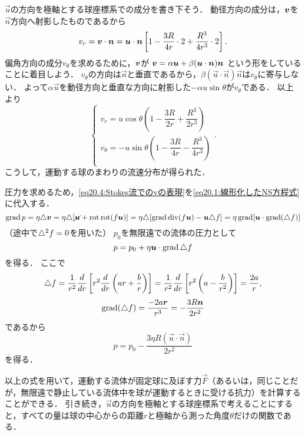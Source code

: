 $\vec{u}$の方向を極軸とする球座標系での成分を書き下そう．
動径方向の成分は，$\vb*{v}$を$\vec{n}$方向へ射影したものであるから
\[
    v_r = \vb*{v}\cdot\vb*{n}
    = \vb*{u}\cdot\vb*{n} \left[ 1 - \frac{3R}{4r} \cdot 2 + \frac{R^3}{4r^3}  \cdot 2 \right].
\]
偏角方向の成分$v_\theta$を求めるために，$\vb*{v}$が
$\vb*{v} = \alpha \vb*{u} + \beta (\vb*{u}\cdot\vb*{n})\vb*{n}$
という形をしていることに着目しよう．
$v_\theta$の方向は$\vec{n}$と垂直であるから，$\beta(\vec{u}\cdot\vec{n})\vec{n}$は$v_\theta$に寄与しない．
よって$\alpha\vec{u}$を動径方向と垂直な方向に射影した$-\alpha u \sin\theta$が$v_\theta$である．
以上より
\begin{equation}\label{eq20.10:Stokes流での流速成分}
    \begin{cases}
        v_r = u\cos\theta \left( 1-\dfrac{3R}{2r} + \dfrac{R^3}{2r^3} \right) \\[7pt]
        v_\theta = -u\sin\theta \left( 1-\dfrac{3R}{4r} - \dfrac{R^3}{4r^3} \right) \\
    \end{cases}.
\end{equation}
こうして，運動する球のまわりの流速分布が得られた．



圧力を求めるため，\eqref{eq20.4:Stokes流でのvの表現}を\eqref{eq20.1:線形化したNS方程式}に代入する．
\[
    \operatorname{grad} p = \eta\triangle\vb*{v}
    = \eta\triangle[ \cancel{\vb*{u}} + \operatorname{rot}\operatorname{rot}(f\vb*{u}) ]
    = \eta\triangle [ \operatorname{grad}\operatorname{div}(f\vb*{u})-\vb*{u}\triangle f ]
    = \eta \operatorname{grad}[ \vb*{u}\cdot\operatorname{grad}(\triangle f) ]
\]
（途中で$\triangle^2f=0$を用いた）
$p_0$を無限遠での流体の圧力として
\begin{equation}
    p = p_0 + \eta \vb*{u}\cdot\operatorname{grad}\triangle f
\end{equation}
を得る．
ここで
\[
    \Laplacian f = \frac{1}{r^2} \ddv{r} \left[ r^2 \ddv{r} \left( ar + \frac{b}{r} \right) \right]
    = \frac{1}{r^2} \ddv{r} \left[ r^2 \left( a - \frac{b}{r^2} \right) \right] = \frac{2a}{r} ,
\]
\[
    \operatorname{grad}(\triangle f ) = \frac{-2a \vb*{r}}{r^3} = - \frac{3R \vb*{n}}{2r^2}
\]であるから
\begin{equation}\label{eq20.12:Stokes流での圧力1}
    p = p_0 - \frac{3\eta R (\vec{u}\cdot\vec{n}) }{2r^2}
\end{equation}
を得る．

以上の式を用いて，運動する流体が固定球に及ぼす力$\vec{F}$（あるいは，同じことだが，無限遠で静止している流体中を球が運動するときに受ける抗力）を計算することができる．
引き続き，$\vec{u}$の方向を極軸とする球座標系で考えることにすると，すべての量は球の中心からの距離$r$と極軸から測った角度$\theta$だけの関数である．

